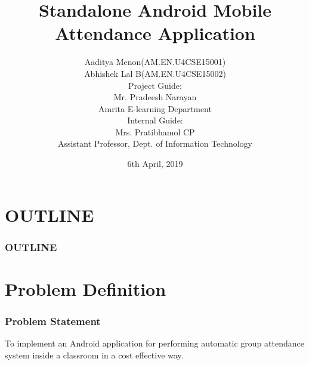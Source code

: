 \documentclass[10pt]{beamer}
\begin{document}
\title {\bfseries{\sc Standalone Android Mobile Attendance Application }}
\author[Aaditya Menon and Abhishek Lal B]{\small {Aaditya Menon(AM.EN.U4CSE15001)\\Abhishek Lal B(AM.EN.U4CSE15002)\\Project Guide:\\Mr. Pradeesh Narayan\\Amrita E-learning Department\\Internal Guide:\\Mrs. Pratibhamol CP\\Assistant Professor, Dept. of Information Technology}}
\date{\small 6th April, 2019} 
\begin{frame}
\titlepage
\end{frame}
\section*{OUTLINE}
\begin{frame}
\frametitle{OUTLINE}  
\tableofcontents
\end{frame}

\section{Problem Definition}
\begin{frame}
\frametitle{Problem Statement}
To implement an Android application for performing automatic group attendance system inside a classroom in a cost effective way.
\end{frame}
\end{document}
